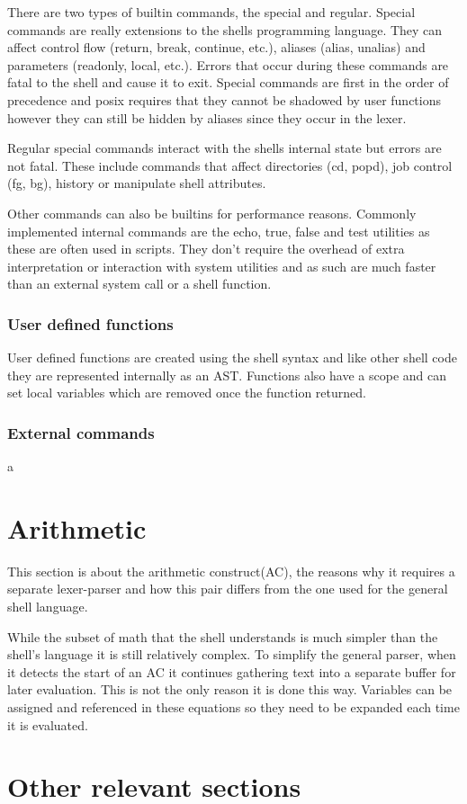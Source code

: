 There are two types of builtin commands, the special and regular.
Special commands are really extensions to the shells programming language.
They can affect control flow (return, break, continue, etc.), aliases (alias, unalias) and parameters (readonly, local, etc.).
Errors that occur during these commands are fatal to the shell and cause it to exit.
Special commands are first in the order of precedence and posix requires that they cannot be shadowed by user functions however they can still be hidden by aliases since they occur in the lexer.

Regular special commands interact with the shells internal state but errors are not fatal.
These include commands that affect directories (cd, popd), job control (fg, bg), history or manipulate shell attributes.

Other commands can also be builtins for performance reasons.
Commonly implemented internal commands are the echo, true, false and test utilities as these are often used in scripts.
They don't require the overhead of extra interpretation or interaction with system utilities and as such are much faster than an external system call or a shell function.

\subsubsection{User defined functions}
User defined functions are created using the shell syntax and like other shell code they are represented internally as an AST.
Functions also have a scope and can set local variables which are removed once the function returned.

\subsubsection{External commands}
a

\section{Arithmetic}
This section is about the arithmetic construct(AC), the reasons why it requires a separate lexer-parser and how this pair differs from the one used for the general shell language.

While the subset of math that the shell understands is much simpler than the shell's language it is still relatively complex. 
To simplify the general parser, when it detects the start of an AC it continues gathering text into a separate buffer for later evaluation.
This is not the only reason it is done this way.
Variables can be assigned and referenced in these equations so they need to be expanded each time it is evaluated.




















\section{Other relevant sections}